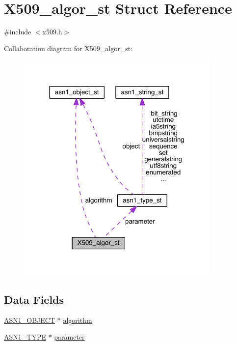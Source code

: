 \hypertarget{struct_x509__algor__st}{}\section{X509\+\_\+algor\+\_\+st Struct Reference}
\label{struct_x509__algor__st}


{\ttfamily \#include $<$x509.\+h$>$}



Collaboration diagram for X509\+\_\+algor\+\_\+st\+:\nopagebreak
\begin{figure}[H]
\begin{center}
\leavevmode
\includegraphics[width=286pt]{struct_x509__algor__st__coll__graph}
\end{center}
\end{figure}
\subsection*{Data Fields}
\begin{DoxyCompactItemize}
\item 
\hyperlink{crypto_2ossl__typ_8h_ae3fda0801e4c8e250087052bafb3ce2e}{A\+S\+N1\+\_\+\+O\+B\+J\+E\+CT} $\ast$ \hyperlink{struct_x509__algor__st_a89501315d92635d17b25568e50adf73a}{algorithm}
\item 
\hyperlink{crypto_2asn1_2asn1_8h_a7895e03d9fee2bc4963faf2a31a9439e}{A\+S\+N1\+\_\+\+T\+Y\+PE} $\ast$ \hyperlink{struct_x509__algor__st_a52a7043c44f1dc2b6b7acac1f6bd29f5}{parameter}
\end{DoxyCompactItemize}


